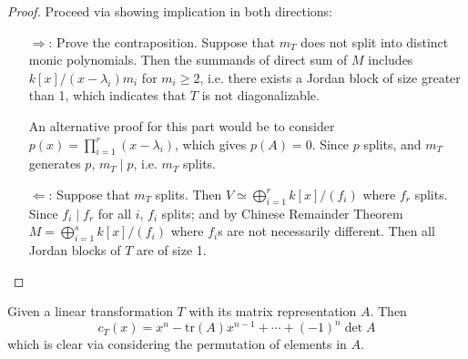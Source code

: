 \documentclass{article}
\begin{document}
\begin{proof}
    Proceed via showing implication in both directions:
    \begin{itemize}
        \item[$\Rightarrow$:] Prove the contraposition. Suppose that $m_T$ does not split into distinct monic polynomials. Then the summands of direct sum of $M$ includes $k[x]/(x - \lambda_i) m_i$ for $m_i \geq 2$, i.e. there exists a Jordan block of size greater than 1, which indicates that $T$ is not diagonalizable.

        An alternative proof for this part would be to consider $p(x) = \prod_{i=1}^r (x - \lambda_i)$, which gives $p(A) = 0$. Since $p$ splits, and $m_T$ generates $p$, $m_T\mid p$, i.e. $m_T$ splits.
        \item[$\Leftarrow$:] Suppose that $m_T$ splits. Then $V \simeq \bigoplus_{i=1}^r k[x]/(f_i)$ where $f_r$ splits. Since $f_i \mid f_r$ for all $i$, $f_i$ splits; and by Chinese Remainder Theorem $M = \bigoplus_{i=1}^s k[x]/(f_i)$ where $f_i$s are not necessarily different. Then all Jordan blocks of $T$ are of size 1.
    \end{itemize}
\end{proof}

\begin{remark}
    Given a linear transformation $T$ with its matrix representation $A$. Then 
    \[
        c_T(x) = x^n - \mathrm{tr}(A) x^{n-1} + \cdots + (-1)^n \det A
    \]
    which is clear via considering the permutation of elements in $A$. 
\end{remark}
\end{document}
